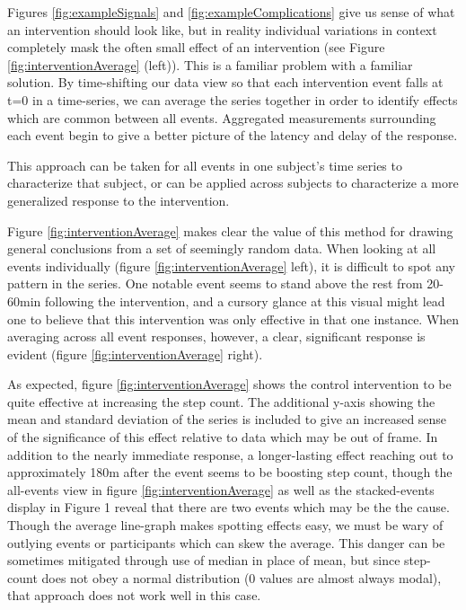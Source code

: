 \documentclass[review,journal]{vgtc}         %
\begin{document}
Figures \ref{fig:exampleSignals} and \ref{fig:exampleComplications} give us sense of what an intervention should look like, but in reality individual variations in context completely mask the often small effect of an intervention (see Figure \ref{fig:interventionAverage} (left)).
This is a familiar problem with a familiar solution.
By time-shifting our data view so that each intervention event falls at t=0 in a time-series, we can average the series together in order to identify effects which are common between all events.
Aggregated measurements surrounding each event begin to give a better picture of the latency and delay of the response.

This approach can be taken for all events in one subject's time series to characterize that subject, or can be applied across subjects to characterize a more generalized response to the intervention.


Figure \ref{fig:interventionAverage} makes clear the value of this method for drawing general conclusions from a set of seemingly random data.
When looking at all events individually (figure \ref{fig:interventionAverage} left), it is difficult to spot any pattern in the series.
One notable event seems to stand above the rest from 20-60min following the intervention, and a cursory glance at this visual might lead one to believe that this intervention was only effective in that one instance.
When averaging across all event responses, however, a clear, significant response is evident (figure \ref{fig:interventionAverage} right).

As expected, figure \ref{fig:interventionAverage} shows the control intervention to be quite effective at increasing the step count.
The additional y-axis showing the mean and standard deviation of the series is included to give an increased sense of the significance of this effect relative to data which may be out of frame.
In addition to the nearly immediate response, a longer-lasting effect reaching out to approximately 180m after the event seems to be boosting step count, though the all-events view in figure \ref{fig:interventionAverage} as well as the stacked-events display in Figure 1 reveal that there are two events which may be the the cause.
Though the average line-graph makes spotting effects easy, we must be wary of outlying events or participants which can skew the average.
This danger can be sometimes mitigated through use of median in place of mean, but since step-count does not obey a normal distribution (0 values are almost always modal), that approach does not work well in this case.
\end{document}
